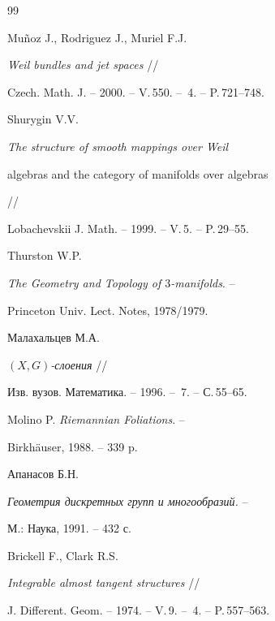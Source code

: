 \begin{thebibliography}{99}


Mu\~noz J., Rodriguez J., Muriel F.J.


{\it Weil bundles and jet spaces} //


Czech. Math. J. -- 2000. -- V.\,550. -- \No\,4. -- P.\,721--748.







Shurygin V.V.


{\it The structure of smooth mappings over Weil


algebras and the category of manifolds over algebras} //


Lobachevskii J. Math. -- 1999. -- V.\,5. -- P.\,29--55.







Thurston W.P.


{\it The Geometry and Topology of $3$-manifolds}. --


Princeton Univ. Lect. Notes, 1978/1979.







Малахальцев М.А.


{\it $(X,G)$-слоения} //


Изв. вузов. Математика. -- 1996. -- \No\,7. -- С.\,55--65.







Molino P. {\it Riemannian Foliations}. --


Birkh\"auser, 1988. -- 339 p.







Апанасов Б.Н.


{\it Геометрия дискретных групп и многообразий.} --


М.: Наука, 1991. -- 432 с.







Brickell F., Clark R.S.


{\it Integrable almost tangent structures} //


J. Different. Geom. -- 1974. -- V.\,9. -- \No\,4. -- P.\,557--563.






\end{thebibliography}
